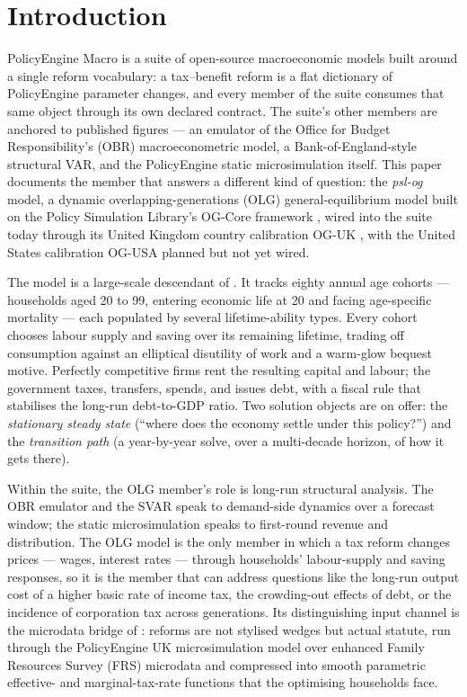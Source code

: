 \section{Introduction}
\label{sec:intro}

PolicyEngine Macro is a suite of open-source macroeconomic models built around a single reform vocabulary: a tax--benefit reform is a flat dictionary of PolicyEngine parameter changes, and every member of the suite consumes that same object through its own declared contract. The suite's other members are anchored to published figures --- an emulator of the Office for Budget Responsibility's (OBR) macroeconometric model, a Bank-of-England-style structural VAR, and the PolicyEngine static microsimulation itself. This paper documents the member that answers a different kind of question: the \emph{psl-og} model, a dynamic overlapping-generations (OLG) general-equilibrium model built on the Policy Simulation Library's OG-Core framework \citep{DeBackerEvans2024}, wired into the suite today through its United Kingdom country calibration OG-UK \citep{OGUKdocs}, with the United States calibration OG-USA \citep{DeBackerEvansOGUSA} planned but not yet wired.

The model is a large-scale descendant of \citet{AuerbachKotlikoff1987}. It tracks eighty annual age cohorts --- households aged 20 to 99, entering economic life at 20 and facing age-specific mortality --- each populated by several lifetime-ability types. Every cohort chooses labour supply and saving over its remaining lifetime, trading off consumption against an elliptical disutility of work and a warm-glow bequest motive. Perfectly competitive firms rent the resulting capital and labour; the government taxes, transfers, spends, and issues debt, with a fiscal rule that stabilises the long-run debt-to-GDP ratio. Two solution objects are on offer: the \emph{stationary steady state} (``where does the economy settle under this policy?'') and the \emph{transition path} (a year-by-year solve, over a multi-decade horizon, of how it gets there).

Within the suite, the OLG member's role is long-run structural analysis. The OBR emulator and the SVAR speak to demand-side dynamics over a forecast window; the static microsimulation speaks to first-round revenue and distribution. The OLG model is the only member in which a tax reform changes prices --- wages, interest rates --- through households' labour-supply and saving responses, so it is the member that can address questions like the long-run output cost of a higher basic rate of income tax, the crowding-out effects of debt, or the incidence of corporation tax across generations. Its distinguishing input channel is the microdata bridge of \citet{DeBackerEvansPhillips2019}: reforms are not stylised wedges but actual statute, run through the PolicyEngine UK microsimulation model \citep{PolicyEngineUK} over enhanced Family Resources Survey (FRS) microdata and compressed into smooth parametric effective- and marginal-tax-rate functions that the optimising households face.

